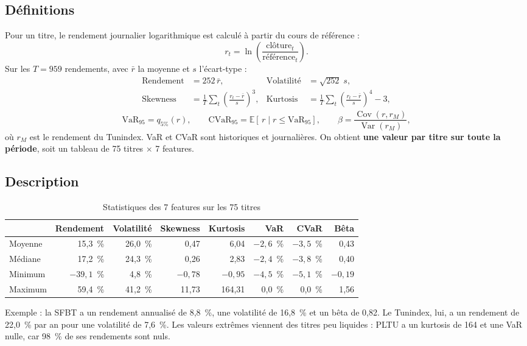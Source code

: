 \documentclass[11pt,a4paper]{article}
\newcommand{\pc}{~\%}
\begin{document}
\subsection{Définitions}
Pour un titre, le rendement journalier logarithmique est calculé à partir du cours de référence :
\begin{equation}
r_t = \ln\!\left(\frac{\text{clôture}_t}{\text{référence}_t}\right).
\end{equation}
Sur les $T = 959$ rendements, avec $\bar r$ la moyenne et $s$ l'écart-type :
\begin{align}
\text{Rendement} &= 252\,\bar r, & \text{Volatilité} &= \sqrt{252}\; s, \\
\text{Skewness} &= \frac{1}{T}\sum_t \left(\frac{r_t-\bar r}{s}\right)^{3}, & \text{Kurtosis} &= \frac{1}{T}\sum_t \left(\frac{r_t-\bar r}{s}\right)^{4} - 3,
\end{align}
\begin{equation}
\text{VaR}_{95} = q_{5\%}(r), \qquad \text{CVaR}_{95} = \mathbb{E}\left[\,r \mid r \leq \text{VaR}_{95}\right], \qquad
\beta = \frac{\operatorname{Cov}(r, r_M)}{\operatorname{Var}(r_M)},
\end{equation}
où $r_M$ est le rendement du Tunindex. VaR et CVaR sont historiques et journalières. On obtient \textbf{une valeur par titre sur toute la période}, soit un tableau de 75 titres $\times$ 7 features.

\subsection{Description}
\begin{table}[H]\centering\small
\caption{Statistiques des 7 features sur les 75 titres}\label{tab:desc-features}
\begin{tabular}{lrrrrrrr}\toprule
 & Rendement & Volatilité & Skewness & Kurtosis & VaR & CVaR & Bêta \\ \midrule
Moyenne & 15,3\pc{} & 26,0\pc{} & 0,47 & 6,04 & $-2{,}6$\pc{} & $-3{,}5$\pc{} & 0,43 \\
Médiane & 17,2\pc{} & 24,3\pc{} & 0,26 & 2,83 & $-2{,}4$\pc{} & $-3{,}8$\pc{} & 0,40 \\
Minimum & $-39{,}1$\pc{} & 4,8\pc{} & $-0{,}78$ & $-0{,}95$ & $-4{,}5$\pc{} & $-5{,}1$\pc{} & $-0{,}19$ \\
Maximum & 59,4\pc{} & 41,2\pc{} & 11,73 & 164,31 & 0,0\pc{} & 0,0\pc{} & 1,56 \\
\bottomrule\end{tabular}
\end{table}
Exemple : la SFBT a un rendement annualisé de 8,8\pc{}, une volatilité de 16,8\pc{} et un bêta de 0,82. Le Tunindex, lui, a un rendement de 22,0\pc{} par an pour une volatilité de 7,6\pc{}. Les valeurs extrêmes viennent des titres peu liquides : PLTU a un kurtosis de 164 et une VaR nulle, car 98\pc{} de ses rendements sont nuls.
\end{document}
